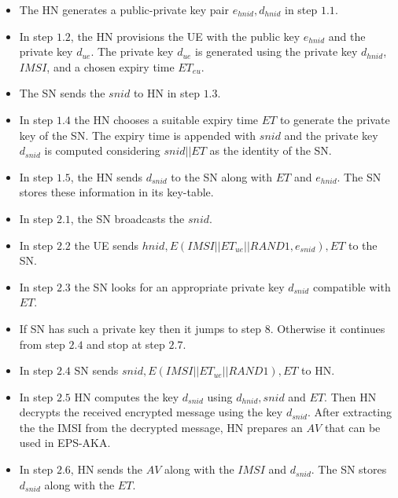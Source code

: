 \documentclass[runningheads,a4paper]{llncs} %
\begin{document}
\begin{itemize}

\item The HN generates a public-private key pair $e_{hnid},d_{hnid}$ in step $1.1$. 

\item In step $1.2$, the HN provisions the UE with the public key $e_{hnid}$ and the private key $d_{ue}$. The private key $d_{ue}$ is generated using the private key $d_{hnid}$, $IMSI$, and a chosen expiry time $ET_{eu}$. 

\item The SN sends the $snid$ to HN in step $1.3$. 

\item In step $1.4$ the HN chooses a suitable expiry time $ET$ to generate the private key of the SN. The expiry time is appended with $snid$ and the private key $d_{snid}$ is computed considering $snid||ET$ as the identity of the SN. 

\item In step $1.5$, the HN sends $d_{snid}$ to the SN along with $ET$ and $e_{hnid}$. The SN stores these information in its key-table. 

\item In step $2.1$, the SN broadcasts the $snid$. 

\item In step $2.2$ the UE sends $hnid,E(IMSI||ET_{ue}||RAND1,e_{snid}),ET$ to the SN. 

\item In step $2.3$ the SN looks for an appropriate private key $d_{snid}$ compatible with $ET$. 

\item If SN has such a private key then it jumps to step $8$. Otherwise it continues from step $2.4$ and stop at step $2.7$. 

\item In step $2.4$ SN sends $snid,E(IMSI||ET_{ue}||RAND1),ET$ to HN. 

\item In step $2.5$ HN computes the key $d_{snid}$ using $d_{hnid},snid$ and $ET$. Then HN decrypts the received encrypted message using the key $d_{snid}$. After extracting the the IMSI from the decrypted message, HN prepares an $AV$ that can be used in EPS-AKA. 

\item In step $2.6$, HN sends the $AV$ along with the $IMSI$ and $d_{snid}$. The SN stores $d_{snid}$ along with the $ET$. 


\end{itemize}
\end{document}
